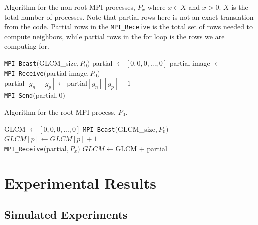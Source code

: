\documentclass{article}
\begin{document}
\begin{algorithm}
    \caption{Algorithm for the non-root MPI processes, $P_x$ where $x \in X$ and $x > 0$. $X$ is the total number of processes. Note that partial rows here is not an exact translation from the code. Partial rows in the  \texttt{MPI\_Receive} is the total set of rows needed to compute neighbors, while partial rows in the for loop is the rows we are computing for. }\label{alg:1}
    \begin{algorithmic}
        \State \texttt{MPI\_Bcast}$($GLCM\_size$, P_0)$
        \State partial $\gets [0, 0, 0, ..., 0]$
        \State partial image $\gets $  \texttt{MPI\_Receive}$($partial image$, P_0)$ \\
            \State partial$[g_{n}][g_p] \gets $partial$[g_{n}][g_p] + 1$
        \EndIf
        \EndWhile \\
        \State \texttt{MPI\_Send}$($partial$, 0)$
    \end{algorithmic}
\end{algorithm}

\begin{algorithm}
    \caption{Algorithm for the root MPI process, $P_0$. }\label{alg:2}
    \begin{algorithmic}
        \State GLCM $\gets [0, 0, 0, ..., 0]$
        \State \texttt{MPI\_Bcast}$($GLCM\_size$, P_0)$ \\ 
            \State $GLCM[p] \gets GLCM[p] + 1$
        \EndIf
        \EndWhile \\
            \State \texttt{MPI\_Receive}$($partial$, P_x)$
            \State $GLCM \gets $GLCM + partial
        \EndFor
    \end{algorithmic}
\end{algorithm}

\section{Experimental Results}
\subsection{Simulated Experiments}
\end{document}
